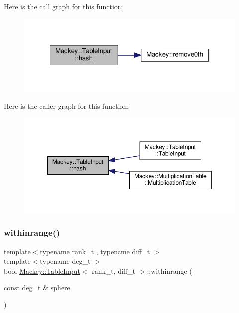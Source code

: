 Here is the call graph for this function\+:\nopagebreak
\begin{figure}[H]
\begin{center}
\leavevmode
\includegraphics[width=322pt]{classMackey_1_1TableInput_a277a59b7c30aa21e37c0ed7f187552cd_cgraph}
\end{center}
\end{figure}
Here is the caller graph for this function\+:\nopagebreak
\begin{figure}[H]
\begin{center}
\leavevmode
\includegraphics[width=350pt]{classMackey_1_1TableInput_a277a59b7c30aa21e37c0ed7f187552cd_icgraph}
\end{center}
\end{figure}
\mbox{\label{classMackey_1_1TableInput_a8fc6c520589273fad3e606a8a72086a8}} 
\subsubsection{\texorpdfstring{withinrange()}{withinrange()}}
{\footnotesize\ttfamily template$<$typename rank\+\_\+t , typename diff\+\_\+t $>$ \\
template$<$typename deg\+\_\+t $>$ \\
bool \hyperlink{classMackey_1_1TableInput}{Mackey\+::\+Table\+Input}$<$ rank\+\_\+t, diff\+\_\+t $>$\+::withinrange (\begin{DoxyParamCaption}\item[{const deg\+\_\+t \&}]{sphere }\end{DoxyParamCaption})\hspace{0.3cm}{\ttfamily [protected]}}



